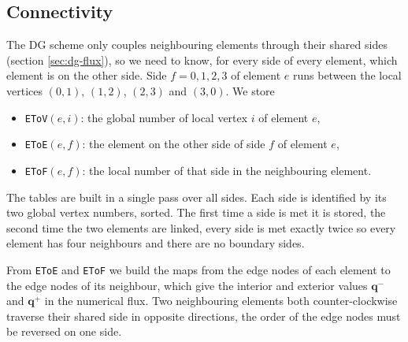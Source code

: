 \subsection{Connectivity}\label{sec:mesh-connectivity}
The DG scheme only couples neighbouring elements through their shared sides (section \ref{sec:dg-flux}), so we need to know, for every side of every element, which element is on the other side. Side $f = 0,1,2,3$ of element $e$ runs between the local vertices $(0,1)$, $(1,2)$, $(2,3)$ and $(3,0)$. We store
\begin{itemize}
    \item \texttt{EToV}$(e,i)$: the global number of local vertex $i$ of element $e$,
    \item \texttt{EToE}$(e,f)$: the element on the other side of side $f$ of element $e$,
    \item \texttt{EToF}$(e,f)$: the local number of that side in the neighbouring element.
\end{itemize}
The tables are built in a single pass over all sides. Each side is identified by its two global vertex numbers, sorted. The first time a side is met it is stored, the second time the two elements are linked, every side is met exactly twice so every element has four neighbours and there are no boundary sides.

From \texttt{EToE} and \texttt{EToF} we build the maps from the edge nodes of each element to the edge nodes of its neighbour, which give the interior and exterior values $\mathbf{q}^-$ and $\mathbf{q}^+$ in the numerical flux. Two neighbouring elements both counter-clockwise traverse their shared side in opposite directions, the order of the edge nodes must be reversed on one side.